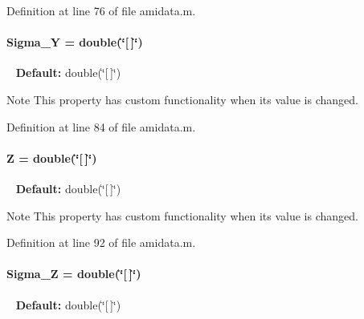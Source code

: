 Definition at line 76 of file amidata.\+m.

\hypertarget{classamidata_a4bd82fb17b03a0039c2f0347ec8dc393}{}
\paragraph[{Sigma\+\_\+\+Y}]{\setlength{\rightskip}{0pt plus 5cm}Sigma\+\_\+\+Y = double(\char`\"{}\mbox{[}$\,$\mbox{]}\char`\"{})}\label{classamidata_a4bd82fb17b03a0039c2f0347ec8dc393}
~\newline
{\bfseries Default\+:} double(\char`\"{}\mbox{[}$\,$\mbox{]}\char`\"{})

\begin{DoxyNote}{Note}
This property has custom functionality when its value is changed. 
\end{DoxyNote}


Definition at line 84 of file amidata.\+m.

\hypertarget{classamidata_adc18d83abfd9f87d396e8fd6b6ac0fe1}{}
\paragraph[{Z}]{\setlength{\rightskip}{0pt plus 5cm}Z = double(\char`\"{}\mbox{[}$\,$\mbox{]}\char`\"{})}\label{classamidata_adc18d83abfd9f87d396e8fd6b6ac0fe1}
~\newline
{\bfseries Default\+:} double(\char`\"{}\mbox{[}$\,$\mbox{]}\char`\"{})

\begin{DoxyNote}{Note}
This property has custom functionality when its value is changed. 
\end{DoxyNote}


Definition at line 92 of file amidata.\+m.

\hypertarget{classamidata_a77b1f0ddcfbfb895b17d62a414d35673}{}
\paragraph[{Sigma\+\_\+\+Z}]{\setlength{\rightskip}{0pt plus 5cm}Sigma\+\_\+\+Z = double(\char`\"{}\mbox{[}$\,$\mbox{]}\char`\"{})}\label{classamidata_a77b1f0ddcfbfb895b17d62a414d35673}
~\newline
{\bfseries Default\+:} double(\char`\"{}\mbox{[}$\,$\mbox{]}\char`\"{})

